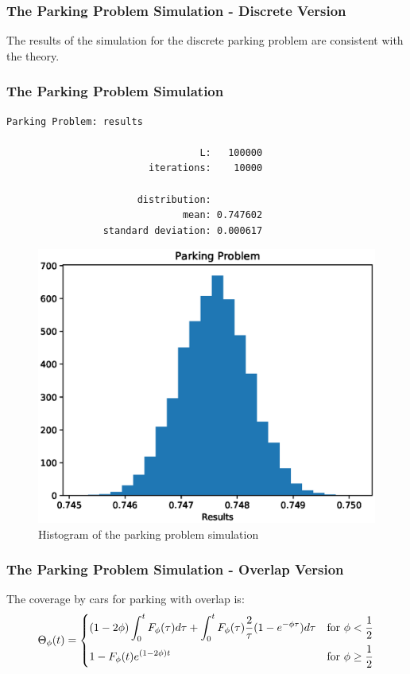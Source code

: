 \documentclass{beamer}
\begin{document}
\begin{frame}[fragile]
	\frametitle{The Parking Problem Simulation - Discrete Version}
	The results of the simulation for the discrete parking problem are consistent with the 
	theory. 
\end{frame}

\begin{frame}[fragile]
    \frametitle{The Parking Problem Simulation}
	\begin{lstlisting}[numbers=none]
                    Parking Problem: results

                                  L:   100000
                         iterations:    10000

                       distribution:
                               mean: 0.747602
                 standard deviation: 0.000617

	\end{lstlisting}
\end{frame}

\begin{frame}
    \begin{figure}
    	\centering
    	\includegraphics[scale = 0.5]{parking_simulation_02.eps}
    	\caption{Histogram of the parking problem simulation}
    \end{figure}
\end{frame}

\begin{frame}[fragile]
    \frametitle{The Parking Problem Simulation - Overlap Version}
    The coverage by cars for parking with overlap is:
    \begin{eqnarray*}
    	\Theta_{\phi}(t) = 
    	\begin{dcases}
    		(1 - 2 \phi) \int_{0}^{t} F_{\phi}(\tau) d \tau  + \int_{0}^{t} F_{\phi}(\tau) \frac{2}{\tau} (1 - e^{-\phi \tau}) d \tau			& \text{for } \phi < \frac{1}{2} \\
    		1 - F_{\phi}(t) e^{(1 - 2 \phi)t}																									& \text{for } \phi \geq \frac{1}{2} 
    	\end{dcases}
    \end{eqnarray*}
\end{frame}
\end{document}
